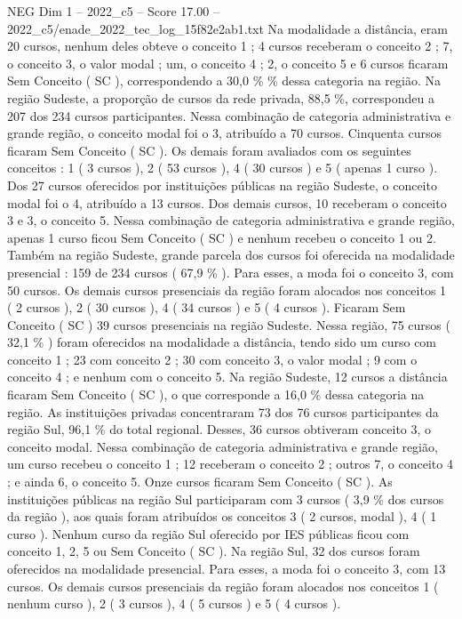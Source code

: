 \begin{textsample}{NEG Dim 1 – 2022\_c5 – Score 17.00 – 2022\_c5/enade\_2022\_tec\_log\_15f82e2ab1.txt}
Na modalidade a distância, eram 20 cursos, nenhum deles obteve o conceito 1 ; 4 cursos receberam o conceito 2 ; 7, o conceito 3, o valor modal ; um, o conceito 4 ; 2, o conceito 5 e 6 cursos ficaram Sem Conceito ( SC ), correspondendo a 30,0 \% \% dessa categoria na região.
Na região Sudeste, a proporção de cursos da rede privada, 88,5 \%, correspondeu a 207 dos 234 cursos participantes.
Nessa combinação de categoria administrativa e grande região, o conceito modal foi o 3, atribuído a 70 cursos.
Cinquenta cursos ficaram Sem Conceito ( SC ).
Os demais foram avaliados com os seguintes conceitos : 1 ( 3 cursos ), 2 ( 53 cursos ), 4 ( 30 cursos ) e 5 ( apenas 1 curso ).
Dos 27 cursos oferecidos por instituições públicas na região Sudeste, o conceito modal foi o 4, atribuído a 13 cursos.
Dos demais cursos, 10 receberam o conceito 3 e 3, o conceito 5.
Nessa combinação de categoria administrativa e grande região, apenas 1 curso ficou Sem Conceito ( SC ) e nenhum recebeu o conceito 1 ou 2.
Também na região Sudeste, grande parcela dos cursos foi oferecida na modalidade presencial : 159 de 234 cursos ( 67,9 \% ).
Para esses, a moda foi o conceito 3, com 50 cursos.
Os demais cursos presenciais da região foram alocados nos conceitos 1 ( 2 cursos ), 2 ( 30 cursos ), 4 ( 34 cursos ) e 5 ( 4 cursos ).
Ficaram Sem Conceito ( SC ) 39 cursos presenciais na região Sudeste.
Nessa região, 75 cursos ( 32,1 \% ) foram oferecidos na modalidade a distância, tendo sido um curso com conceito 1 ; 23 com conceito 2 ; 30 com conceito 3, o valor modal ; 9 com o conceito 4 ; e nenhum com o conceito 5.
Na região Sudeste, 12 cursos a distância ficaram Sem Conceito ( SC ), o que corresponde a 16,0 \% dessa categoria na região.
As instituições privadas concentraram 73 dos 76 cursos participantes da região Sul, 96,1 \% do total regional.
Desses, 36 cursos obtiveram conceito 3, o conceito modal.
Nessa combinação de categoria administrativa e grande região, um curso recebeu o conceito 1 ; 12 receberam o conceito 2 ; outros 7, o conceito 4 ; e ainda 6, o conceito 5.
Onze cursos ficaram Sem Conceito ( SC ).
As instituições públicas na região Sul participaram com 3 cursos ( 3,9 \% dos cursos da região ), aos quais foram atribuídos os conceitos 3 ( 2 cursos, modal ), 4 ( 1 curso ).
Nenhum curso da região Sul oferecido por IES públicas ficou com conceito 1, 2, 5 ou Sem Conceito ( SC ).
Na região Sul, 32 dos cursos foram oferecidos na modalidade presencial.
Para esses, a moda foi o conceito 3, com 13 cursos.
Os demais cursos presenciais da região foram alocados nos conceitos 1 ( nenhum curso ), 2 ( 3 cursos ), 4 ( 5 cursos ) e 5 ( 4 cursos ).

\end{textsample}
